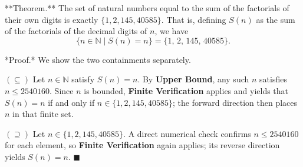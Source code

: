 **Theorem.** The set of natural numbers equal to the sum of the factorials of their own digits is exactly $\{1, 2, 145, 40585\}$. That is, defining $S(n)$ as the sum of the factorials of the decimal digits of $n$, we have
$$\{ n \in \mathbb{N} \mid S(n) = n \} = \{1,\, 2,\, 145,\, 40585\}.$$

*Proof.* We show the two containments separately.

$(\subseteq)$ Let $n \in \mathbb{N}$ satisfy $S(n) = n$. By \textbf{Upper Bound}, any such $n$ satisfies $n \leq 2540160$. Since $n$ is bounded, \textbf{Finite Verification} applies and yields that $S(n) = n$ if and only if $n \in \{1, 2, 145, 40585\}$; the forward direction then places $n$ in that finite set.

$(\supseteq)$ Let $n \in \{1, 2, 145, 40585\}$. A direct numerical check confirms $n \leq 2540160$ for each element, so \textbf{Finite Verification} again applies; its reverse direction yields $S(n) = n$. $\blacksquare$